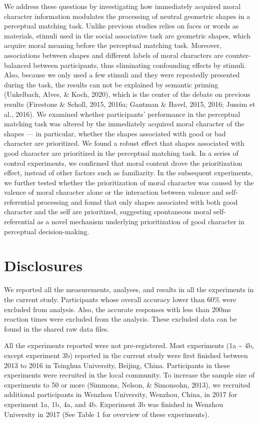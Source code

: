 \documentclass[
  man]{apa6}
\begin{document}
We address these questions by investigating how immediately acquired moral character information modulates the processing of neutral geometric shapes in a perceptual matching task. Unlike previous studies relies on faces or words as materials, stimuli used in the social associative task are geometric shapes, which acquire moral meaning before the perceptual matching task. Moreover, associations between shapes and different labels of moral characters are counter-balanced between participants, thus eliminating confounding effects by stimuli. Also, because we only used a few stimuli and they were repeatedly presented during the task, the results can not be explained by semantic priming (Unkelbach, Alves, \& Koch, 2020), which is the center of the debate on previous results (Firestone \& Scholl, 2015, 2016a; Gantman \& Bavel, 2015, 2016; Jussim et al., 2016). We examined whether participants' performance in the perceptual matching task was altered by the immediately acquired moral character of the shapes --- in particular, whether the shapes associated with good or bad character are prioritized. We found a robust effect that shapes associated with good character are prioritized in the perceptual matching task. In a series of control experiments, we confirmed that moral content drove the prioritization effect, instead of other factors such as familiarity. In the subsequent experiments, we further tested whether the prioritization of moral character was caused by the valence of moral character alone or the interaction between valence and self-referential processing and found that only shapes associated with both good character and the self are prioritized, suggesting spontaneous moral self-referential as a novel mechanism underlying prioritization of good character in perceptual decision-making.

\hypertarget{disclosures}{%
\section{Disclosures}\label{disclosures}}

We reported all the measurements, analyses, and results in all the experiments in the current study. Participants whose overall accuracy lower than 60\% were excluded from analysis. Also, the accurate responses with less than 200ms reaction times were excluded from the analysis. These excluded data can be found in the shared raw data files.

All the experiments reported were not pre-registered. Most experiments (1a \textasciitilde{} 4b, except experiment 3b) reported in the current study were first finished between 2013 to 2016 in Tsinghua University, Beijing, China. Participants in these experiments were recruited in the local community. To increase the sample size of experiments to 50 or more (Simmons, Nelson, \& Simonsohn, 2013), we recruited additional participants in Wenzhou University, Wenzhou, China, in 2017 for experiment 1a, 1b, 4a, and 4b. Experiment 3b was finished in Wenzhou University in 2017 (See Table 1 for overview of these experiments).
\end{document}
